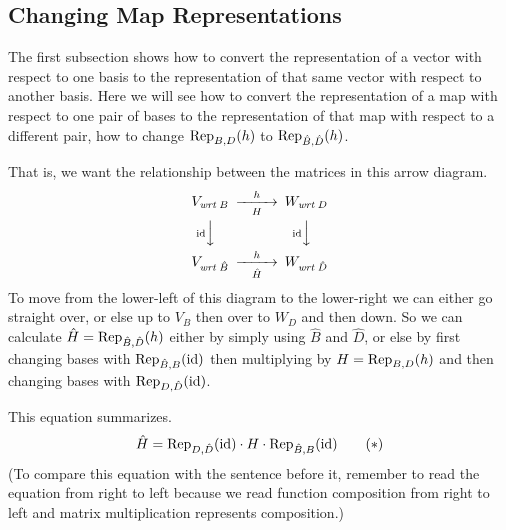 \subsection{Changing Map Representations}
The first subsection shows how to convert the representation
of a vector with respect to one basis to the representation of that
same vector with respect to another basis.
Here we will see how to
convert the representation of a map  with
respect to one pair of bases  to the representation of that
map with respect to a different pair, how to change
$\rep{h}{B,D}$ to $\rep{h}{\hat{B},\hat{D}}$.

That is, we want the relationship between the matrices in this 
arrow diagram.
\begin{equation*}
  \begin{CD}
    V_{\wrt{B}}                   @>h>H>        W_{\wrt{D}}       \\
    @V{\text{\scriptsize$\identity$}} VV                @V{\text{\scriptsize$\identity$}} VV \\
    V_{\wrt{\hat{B}}}             @>h>\hat{H}>  W_{\wrt{\hat{D}}}
  \end{CD}
\end{equation*}
To move from the lower-left of this diagram 
to the lower-right we can either go straight over, or
else up to $V_B$ then over to $W_D$ and then down.
So 
we can calculate $\hat{H}=\rep{h}{\hat{B},\hat{D}}$ 
either by simply using $\hat{B}$ and $\hat{D}$,
or else by first changing bases with $\rep{\identity}{\hat{B},B}$ 
then multiplying by \( H=\rep{h}{B,D} \)
and then changing bases with $\rep{\identity}{D,\hat{D}}$.

This equation summarizes.
\begin{equation*}
   \hat{H}=
   \rep{\identity}{D,\hat{D}}\cdot H\cdot \rep{\identity}{\hat{B},B}
\tag*{\text{($*$})}\end{equation*}
(To compare this equation with the sentence before it, remember to read the
equation from right to left because we read
function composition from right to left and matrix multiplication 
represents composition.)

